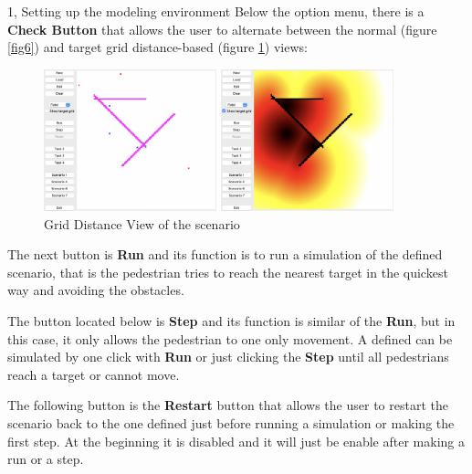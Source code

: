 \documentclass[10pt,a4paper]{article}
\begin{document}
\begin{task}{1, Setting up the modeling environment}
Below the option menu, there is a \textbf{Check Button} that allows the user to alternate between the normal (figure \ref{fig6}) and target grid distance-based (figure \ref{fig7}) views: 

\begin{figure}[!h]
    \begin{minipage}[c]{0.4\linewidth}
        \centering
        \includegraphics[width=5cm]{normal_view}
        \caption{Normal View of the scenario}
        \label{fig6}
    \end{minipage}\hfill
    \begin{minipage}[c]{0.4\linewidth}
        \centering
        \includegraphics[width=5cm]{special_view}
        \caption{Grid Distance View of the scenario}
        \label{fig7}
    \end{minipage}
\end{figure}

The next button is \textbf{Run} and its function is to run a simulation of the defined scenario, that is the pedestrian tries to reach the nearest target in the quickest way and avoiding the obstacles.

The button located below is \textbf{Step} and its function is similar of the \textbf{Run}, but in this case, it only allows the pedestrian to one only movement. A defined can be simulated by one click with \textbf{Run} or just clicking the \textbf{Step} until all pedestrians reach a target or cannot move.

The following button is the \textbf{Restart} button that allows the user to restart the scenario back to the one defined just before running a simulation or making the first step. At the beginning it is disabled and it will just be enable after making a run or a step.


\end{task}
\end{document}
